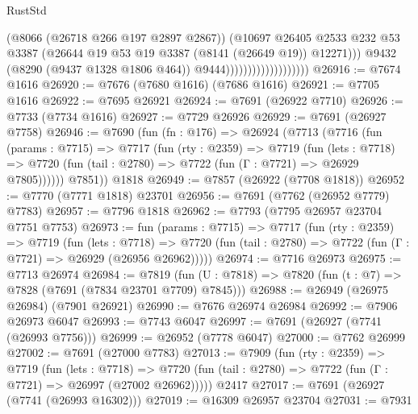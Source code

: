 \begin{lexlean}{RustStd}
\begin{coremodule}
                                            (@8066 (@26718 @266 @197 @2897 @2867))
                                            (@10697
                                              @26405
                                              @2533
                                              @232
                                              @53
                                              @3387
                                              (@26644
                                                @19
                                                @53
                                                @19
                                                @3387
                                                (@8141 (@26649 @19))
                                                @12271)))
                                          @9432
                                          (@8290 (@9437 @1328 @1806 @464))
                                          @9444)))))))))))))))))))
@26916 := @7674 @1616
@26920 := @7676 (@7680 @1616) (@7686 @1616)
@26921 := @7705 @1616
@26922 := @7695 @26921
@26924 := @7691 (@26922 @7710)
@26926 := @7733 (@7734 @1616)
@26927 := @7729 @26926
@26929 := @7691 (@26927 @7758)
@26946 := @7690
    (fun (fn : @176) =>
    @26924
      (@7713
        (@7716
          (fun (params : @7715) =>
          @7717
            (fun (rty : @2359) =>
            @7719
              (fun (lets : @7718) =>
              @7720 (fun (tail : @2780) => @7722 (fun (Γ : @7721) => @26929 @7805))))))
        @7851))
    @1818
@26949 := @7857 (@26922 (@7708 @1818))
@26952 := @7770 (@7771 @1818) @23701
@26956 := @7691 (@7762 (@26952 @7779) @7783)
@26957 := @7796 @1818
@26962 := @7793 (@7795 @26957 @23704 @7751 @7753)
@26973 := fun (params : @7715) =>
  @7717
    (fun (rty : @2359) =>
    @7719
      (fun (lets : @7718) =>
      @7720 (fun (tail : @2780) => @7722 (fun (Γ : @7721) => @26929 (@26956 @26962)))))
@26974 := @7716 @26973
@26975 := @7713 @26974
@26984 := @7819
    (fun (U : @7818) => @7820 (fun (t : @7) => @7828 (@7691 (@7834 @23701 @7709) @7845)))
@26988 := @26949 (@26975 @26984) (@7901 @26921)
@26990 := @7676 @26974 @26984
@26992 := @7906 @26973 @6047
@26993 := @7743 @6047
@26997 := @7691 (@26927 (@7741 (@26993 @7756)))
@26999 := @26952 (@7778 @6047)
@27000 := @7762 @26999
@27002 := @7691 (@27000 @7783)
@27013 := @7909
    (fun (rty : @2359) =>
    @7719
      (fun (lets : @7718) =>
      @7720 (fun (tail : @2780) => @7722 (fun (Γ : @7721) => @26997 (@27002 @26962)))))
    @2417
@27017 := @7691 (@26927 (@7741 (@26993 @16302)))
@27019 := @16309 @26957 @23704
@27031 := @7931

\end{coremodule}
\end{lexlean}

